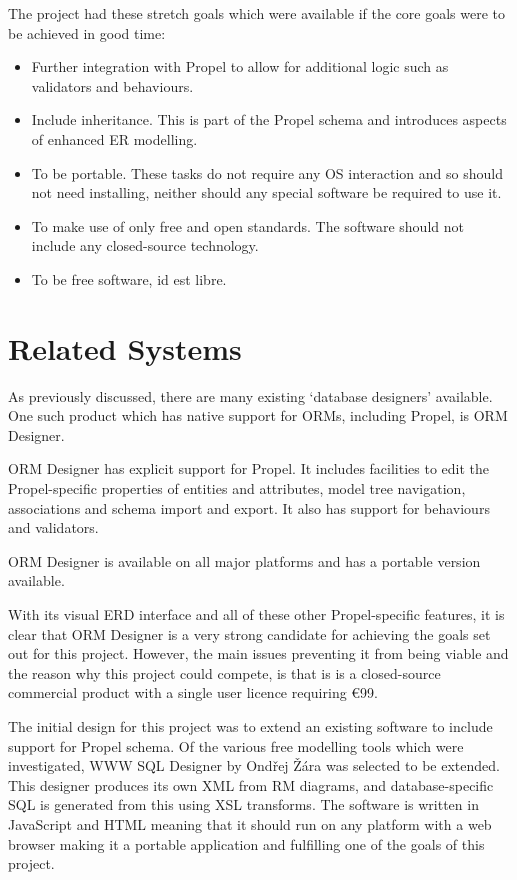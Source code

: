 The project had these stretch goals which were available if the core goals were to be achieved in good time:
\begin{itemize}
	\item Further integration with Propel to allow for additional logic such as validators and behaviours.
	\item Include inheritance. This is part of the Propel schema and introduces aspects of enhanced ER modelling.
	\item To be portable. These tasks do not require any OS interaction and so should not need installing, neither should any special software be required to use it.
	\item To make use of only free and open standards. The software should not include any closed-source technology.
	\item To be free software, id est libre.
\end{itemize}

\section{Related Systems}
As previously discussed, there are many existing `database designers' available. One such product which has native support for ORMs, including Propel, is ORM Designer.

ORM Designer has explicit support for Propel. It includes facilities to edit the Propel-specific properties of entities and attributes, model tree navigation, associations and schema import and export. It also has support for behaviours and validators.

ORM Designer is available on all major platforms and has a portable version available.

With its visual ERD interface and all of these other Propel-specific features, it is clear that ORM Designer is a very strong candidate for achieving the goals set out for this project. However, the main issues preventing it from being viable and the reason why this project could compete, is that is is a closed-source commercial product with a single user licence requiring \euro99.

The initial design for this project was to extend an existing software to include support for Propel schema. Of the various free modelling tools which were investigated, WWW SQL Designer by Ond\v{r}ej \v{Z}\'{a}ra was selected to be extended. This designer produces its own XML from RM diagrams, and database-specific SQL is generated from this using XSL transforms. The software is written in JavaScript and HTML meaning that it should run on any platform with a web browser making it a portable application and fulfilling one of the goals of this project.

